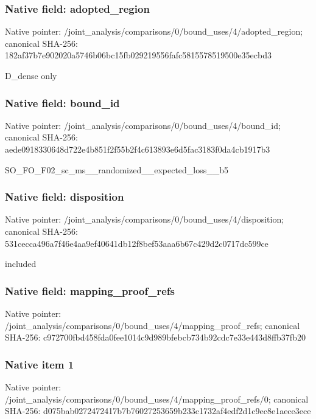 \documentclass[10pt,a4paper]{article}
\begin{document}
\subsubsection{Native field: adopted\_\allowbreak{}region}
Native pointer: /joint\_\allowbreak{}analysis/comparisons/0/bound\_\allowbreak{}uses/4/adopted\_\allowbreak{}region; canonical SHA-256: 182af37b7e902020a5746b06bc15fb029219556fafc5815578519500e35ecbd3

\begingroup\raggedright\sloppy D\_\allowbreak{}dense only\par\endgroup

\subsubsection{Native field: bound\_\allowbreak{}id}
Native pointer: /joint\_\allowbreak{}analysis/comparisons/0/bound\_\allowbreak{}uses/4/bound\_\allowbreak{}id; canonical SHA-256: aede0918330648d722e4b851f2f55b2f4c613893e6d5fac3183f0da4cb1917b3

\begingroup\raggedright\sloppy SO\_\allowbreak{}FO\_\allowbreak{}F02\_\allowbreak{}sc\_\allowbreak{}ms\_\allowbreak{}\_\allowbreak{}randomized\_\allowbreak{}\_\allowbreak{}expected\_\allowbreak{}loss\_\allowbreak{}\_\allowbreak{}b5\par\endgroup

\subsubsection{Native field: disposition}
Native pointer: /joint\_\allowbreak{}analysis/comparisons/0/bound\_\allowbreak{}uses/4/disposition; canonical SHA-256: 531cecca496a7f46e4aa9ef40641db12f8bef53aaa6b67c429d2c0717dc599ce

\begingroup\raggedright\sloppy included\par\endgroup

\subsubsection{Native field: mapping\_\allowbreak{}proof\_\allowbreak{}refs}
Native pointer: /joint\_\allowbreak{}analysis/comparisons/0/bound\_\allowbreak{}uses/4/mapping\_\allowbreak{}proof\_\allowbreak{}refs; canonical SHA-256: c972700fbd458fda0fee1014c9d989bfebcb734b92cdc7e33e443d8ffb37fb20

\subsubsection{Native item 1}
Native pointer: /joint\_\allowbreak{}analysis/comparisons/0/bound\_\allowbreak{}uses/4/mapping\_\allowbreak{}proof\_\allowbreak{}refs/0; canonical SHA-256: d075bab0272472417b7b76027253659b233c1732af4edf2d1c9ec8e1aece3ece
\end{document}
